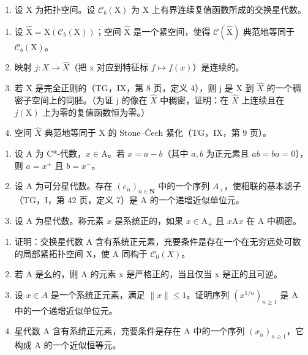\begin{enumerate}
\def\labelenumi{\arabic{enumi})}
\setcounter{enumi}{15}
\tightlist
\item
  设 X 为拓扑空间。设 \(\mathcal{C}_{b}(\mathrm{X})\) 为 X 上有界连续复值函数所成的交换星代数。
\end{enumerate}

\begin{enumerate}
\def\labelenumi{\alph{enumi})}
\item
  设 \(\widehat{\mathrm{X}} = \mathrm{X}(\mathcal{C}_b(\mathrm{X}))\)；空间 \(\widehat{\mathrm{X}}\) 是一个紧空间，使得 \(\mathcal{C}(\widehat{\mathrm{X}})\) 典范地等同于 \(\mathcal{C}_b(\mathrm{X})\)。
\item
  映射 \(j: X \to \widehat{X}\)（把 x 对应到特征标 \(f \mapsto f(x)\)）是连续的。
\item
  若 X 是完全正则的（TG，IX，第 8 页，定义 4），则 j 是 X 到 \(\widehat{X}\) 的一个稠密子空间上的同胚。（为证 j 的像在 \(\widehat{X}\) 中稠密，证明：在 \(\widehat{X}\) 上连续且在 \(j(\mathrm{X})\) 上为零的复值函数恒为零。）
\item
  空间 \(\widehat{X}\) 典范地等同于 X 的 Stone–Čech 紧化（TG，IX，第 9 页）。
\end{enumerate}

\begin{enumerate}
\def\labelenumi{\arabic{enumi})}
\setcounter{enumi}{16}
\item
  设 A 为 C*-代数，\(x \in \mathrm{A}\)。若 \(x = a - b\)（其中 \(a, b\) 为正元素且 \(ab = ba = 0\)），则 \(a = x^{+}\) 且 \(b = x^{-}\)。
\item
  设 A 为可分星代数。存在 \((e_{n})_{n\in\mathbf{N}}\) 中的一个序列 \(A_{+}\)，使相联的基本滤子（TG，I，第 42 页，定义 7）是 A 的一个递增近似单位元。
\item
  设 A 为星代数。称元素 \(x\) 是系统正的，如果 \(x \in \mathrm{A}_{+}\) 且 \(x\mathrm{A}x\) 在 A 中稠密。
\end{enumerate}

\begin{enumerate}
\def\labelenumi{\alph{enumi})}
\item
  证明：交换星代数 A 含有系统正元素，充要条件是存在一个在无穷远处可数的局部紧拓扑空间 X，使 A 同构于 \(\mathcal{C}_{0}(X)\)。
\item
  若 A 是幺的，则 A 的元素 x 是严格正的，当且仅当 x 是正的且可逆。
\item
  设 \(x \in A\) 是一个系统正元素，满足 \(\|x\| \leqslant 1\)。证明序列 \((x^{1/n})_{n \geqslant 1}\) 是 A 中的一个递增近似单位元。
\item
  星代数 A 含有系统正元素，充要条件是存在 A 中的一个序列 \((x_{n})_{n\geqslant1}\)，它构成 A 的一个近似恒等元。
\end{enumerate}

